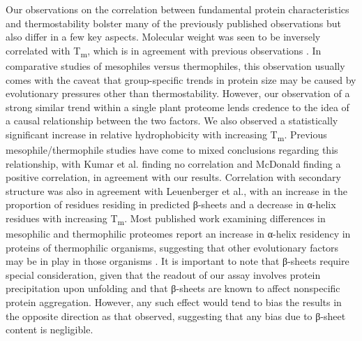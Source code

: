 \documentclass[11pt,letter]{article}\usepackage[]{graphicx}\usepackage[]{color}
\newcommand{\Tm}{T\textsubscript{m}}
\newcommand{\ahelix}{α-helix}
\newcommand{\bsheet}{β-sheet}
\begin{document}
Our observations on the correlation between fundamental protein
characteristics and thermostability bolster many of the previously published
observations but also differ in a few key aspects. Molecular weight
was seen to be inversely correlated with \Tm{}, which is in agreement with
previous observations \cite{ghosh_computing_2009, leuenberger_cell-wide_2017}.
In comparative studies of mesophiles versus thermophiles, this observation usually
comes with the caveat that group-specific trends in protein size may be caused
by evolutionary pressures other than thermostability. However, our observation
of a strong similar trend within a single plant proteome lends credence to the
idea of a causal relationship between the two factors. We also observed a
statistically significant increase in relative hydrophobicity with increasing
\Tm{}. Previous mesophile/thermophile studies have come to mixed conclusions
regarding this relationship, with Kumar et al. \cite{kumar_factors_2000}
finding no correlation and McDonald \cite{mcdonald_temperature_2010} finding a
positive correlation, in agreement with our results. Correlation with secondary
structure was also in agreement with Leuenberger et al., with an increase in
the proportion of residues residing in predicted \bsheet{}s and a decrease in
\ahelix{} residues with increasing \Tm{}. Most published work examining
differences in mesophilic and thermophilic proteomes report an increase in
\ahelix{} residency in proteins of thermophilic organisms, suggesting that
other evolutionary factors may be in play in those organisms
\cite{kumar_factors_2000,merkler_protein_1981,vogt_protein_1997}. It is
important to note that \bsheet{}s require special consideration, given that the
readout of our assay involves protein precipitation upon unfolding and that
\bsheet{}s are known to affect nonspecific protein aggregation. However, any
such effect would tend to bias the results in the opposite direction as that
observed, suggesting that any bias due to \bsheet{} content is negligible.
\end{document}
